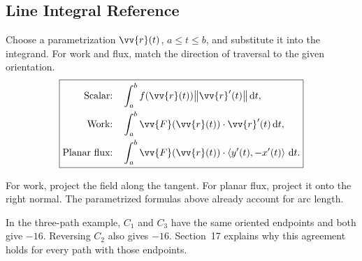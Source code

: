 \newpage
\subsection{Line Integral Reference}
Choose a parametrization $\vv{r}(t)$, $a \le t \le b$, and substitute it into the integrand. For work and flux, match the direction of traversal to the given orientation.
\[
    \boxed{\begin{aligned}
        \text{Scalar:}\quad &\int_a^b f(\vv{r}(t))\norm{\vv{r}'(t)}\,\dd{t},\\
        \text{Work:}\quad &\int_a^b \vv{F}(\vv{r}(t))\cdot\vv{r}'(t)\,\dd{t},\\
        \text{Planar flux:}\quad &\int_a^b \vv{F}(\vv{r}(t))\cdot\ang{y'(t),-x'(t)}\,\dd{t}.
    \end{aligned}}
\]

For work, project the field along the tangent. For planar flux, project it onto the right normal. The parametrized formulas above already account for arc length.

In the three-path example, $C_1$ and $C_3$ have the same oriented endpoints and both give $-16$. Reversing $C_2$ also gives $-16$. Section~17 explains why this agreement holds for every path with those endpoints.
